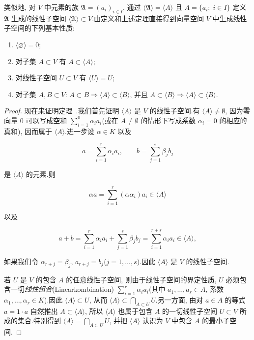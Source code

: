 类似地, 对 $V$ 中元素的族 $\mathfrak{A} = (a_i)_{i \in I}$, 通过 $\langle \mathfrak{A} \rangle = \langle A \rangle$ 且 $A = \{a_i;\; i \in I\}$ 定义 $\mathfrak{A}$ 生成的线性子空间 $\langle \mathfrak{A} \rangle \subset V$.由定义和上述定理直接得到向量空间 $V$ 中生成线性子空间的下列基本性质:
\begin{enumerate}
\item[(1)] $\langle \varnothing \rangle = 0$;
\item[(2)] 对子集 $A \subset V$ 有 $A \subset \langle A \rangle$;
\item[(3)] 对线性子空间 $U \subset V$ 有 $\langle U \rangle = U$;
\item[(4)] 对子集 $A, B \subset V$: $A \subset B \Longrightarrow \langle A \rangle \subset \langle B \rangle$, 并且 $A \subset \langle B \rangle \Longrightarrow \langle A \rangle \subset \langle B \rangle$.
\end{enumerate}

\begin{proof}
现在来证明定理~.我们首先证明 $\langle A \rangle$ 是 $V$ 的线性子空间.有 $\langle A \rangle \neq \emptyset$, 因为零向量 $0$ 可以写成空和 $\sum_{i = 1}^{0} \alpha_i a_i$(或在 $A \neq \emptyset$ 的情形下写成系数 $\alpha_i = 0$ 的相应的真和), 因而属于 $\langle A \rangle$.进一步设 $\alpha \in K$ 以及

\[
a = \sum_{i = 1}^{r} \alpha_i a_i, \qquad b = \sum_{j = 1}^{s} \beta_j b_j
\]

是 $\langle A \rangle$ 的元素.则

\[
\alpha a = \sum_{i = 1}^{r} (\alpha \alpha_i) a_i \in \langle A \rangle
\]

以及

\[
a + b = \sum_{i = 1}^{r} \alpha_i a_i + \sum_{j = 1}^{s} \beta_j b_j = \sum_{i = 1}^{r + s} \alpha_i a_i \in \langle A \rangle,
\]

如果我们令 $\alpha_{r + j} = \beta_j$, $a_{r + j} = b_j$($j = 1, \ldots, s$).因此 $\langle A \rangle$ 是 $V$ 的线性子空间.

若 $U$ 是 $V$ 的包含 $A$ 的任意线性子空间, 则由于线性子空间的界定性质, $U$ 必须包含一切\emph{线性组合}(\textup{Linearkombination}) $\sum_{i = 1}^{r} \alpha_i a_i$(其中 $a_1, \ldots, a_r \in A$, 系数 $\alpha_1, \ldots, \alpha_r \in K$).因此 $\langle A \rangle \subset U$, 从而 $\langle A \rangle \subset \bigcap_{A \subset U} U$.另一方面, 由对 $a \in A$ 的等式 $a = 1 \cdot a$ 自然推出 $A \subset \langle A \rangle$, 所以 $\langle A \rangle$ 也属于包含 $A$ 的一切线性子空间 $U \subset V$ 所成的集合.特别得到 $\langle A \rangle = \bigcap_{A \subset U} U$, 并把 $\langle A \rangle$ 认识为 $V$ 中包含 $A$ 的最小子空间.
\end{proof}

